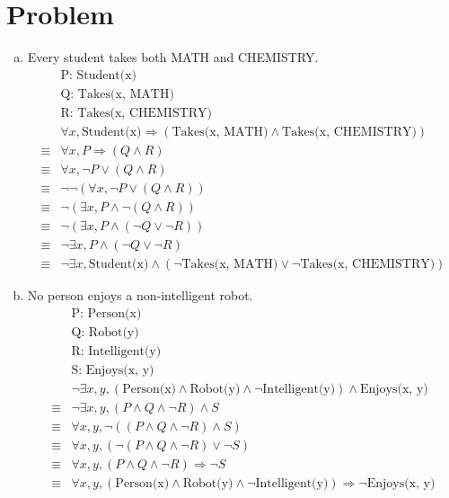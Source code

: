 \documentclass[11pt, oneside]{article}      %
\begin{document}
\section {Problem}
\begin{enumerate}[a. ] %
  \item Every student takes both MATH and CHEMISTRY.
  \begin{align*}
    &\text{P: Student(x)} \\
    &\text{Q: Takes(x, MATH)} \\
    &\text{R: Takes(x, CHEMISTRY)} \\
    &\forall x, \text{Student(x)}\Rightarrow \left(\text{Takes(x, MATH)}\land \text{Takes(x, CHEMISTRY)}\right) \\
    \equiv &\forall x, P \Rightarrow \left(Q\land R\right) \\
    \equiv &\forall x, \neg P \lor \left(Q\land R\right) \\
    \equiv &\neg \neg \left(\forall x, \neg P \lor \left(Q\land R\right)\right) \\
    \equiv &\neg \left(\exists x, P \land\neg \left(Q\land R\right)\right) \\
    \equiv &\neg \left(\exists x, P \land\left(\neg Q\lor \neg R\right)\right) \\
    \equiv &\neg \exists x, P \land \left(\neg Q\lor \neg R\right) \\
    \equiv &\neg \exists x, \text{Student(x)} \land \left(\neg\text{Takes(x, MATH)}\lor\neg \text{Takes(x, CHEMISTRY)}\right)
  \end{align*}
  \item No person enjoys a non-intelligent robot.
  \begin{align*}
    &\text{P: Person(x)} \\
    &\text{Q: Robot(y)} \\
    &\text{R: Intelligent(y)} \\
    &\text{S: Enjoys(x, y)} \\
    &\neg \exists x, y,\left(\text{Person(x)}\land \text{Robot(y)}\land \neg \text{Intelligent(y)}\right)\land \text{Enjoys(x, y)} \\
    \equiv &\neg \exists x, y,\left(P\land Q\land \neg R\right)\land S \\
    \equiv &\forall x, y, \neg \left(\left(P\land Q\land\neg R\right)\land S\right) \\
    \equiv &\forall x, y, \left(\neg\left(P\land Q\land\neg R\right)\lor \neg S\right) \\
    \equiv &\forall x, y, \left(P\land Q\land\neg R\right)\Rightarrow\neg S \\
    \equiv &\forall x, y, \left(\text{Person(x)}\land \text{Robot(y)}\land\neg \text{Intelligent(y)}\right)\Rightarrow \neg\text{Enjoys(x, y)} \\
  \end{align*}
\end{enumerate}
\end{document}
